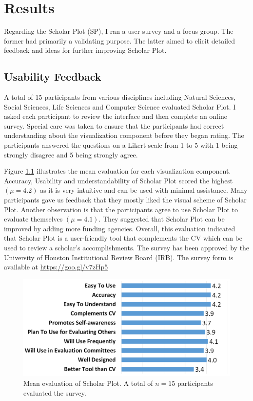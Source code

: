 \chapter{Results}\label{chap:Results}
Regarding the Scholar Plot (SP), I ran a user survey and a focus group. The former had primarily a validating purpose. The latter aimed to elicit detailed feedback and ideas for further improving Scholar Plot. 

\section{Usability Feedback}

A total of 15 participants from various disciplines including Natural Sciences, Social Sciences, Life Sciences and Computer Science evaluated Scholar Plot. I asked each participant to review the interface and then complete an online survey. Special care was taken to ensure that the participants had correct understanding about the visualization component before they began rating. The participants answered the questions on a Likert scale from 1 to 5 with 1 being strongly disagree and 5 being strongly agree.

Figure \ref{fig:UserStudy} illustrates the mean evaluation for each visualization component. Accuracy, Usability and understandability of Scholar Plot scored the highest $(\mu = 4.2)$ as it is very intuitive and can be used with minimal assistance. Many participants gave us feedback that they mostly liked the visual scheme of Scholar Plot. Another observation is that the participants agree to use Scholar Plot to evaluate themselves $(\mu = 4.1)$. They suggested that Scholar Plot can be improved by adding more funding agencies. Overall, this evaluation indicated that Scholar Plot is a user-friendly tool that complements the CV which can be used to review a scholar's accomplishments. The survey has been approved by the University of Houston Institutional Review Board (IRB). The survey form is available at \url{https://goo.gl/v7zHp5}
 
 \begin{figure}
  \centering
  \includegraphics[width=\columnwidth]{figures/fig_survey_chart}
  \caption{Mean evaluation of Scholar Plot. A total of $n=15$ participants evaluated the survey.}
  \label{fig:UserStudy} 
\end{figure}

